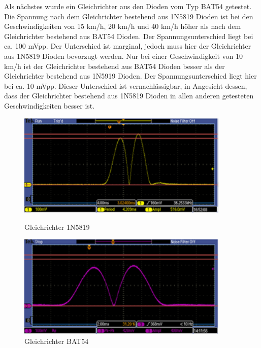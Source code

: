 Als nächstes wurde ein Gleichrichter aus den Dioden vom Typ BAT54 getestet. Die Spannung nach dem Gleichrichter bestehend aus 1N5819 Dioden ist bei den Geschwindigkeiten von 15 km/h, 20 km/h und 40 km/h höher als nach dem Gleichrichter bestehend aus BAT54 Dioden. Der Spannungsunterschied liegt bei ca. 100 mVpp. Der Unterschied ist marginal, jedoch muss hier der Gleichrichter aus 1N5819 Dioden bevorzugt werden. Nur bei einer Geschwindigkeit von 10 km/h ist der Gleichrichter bestehend aus BAT54 Dioden besser als der Gleichrichter bestehend aus 1N5919 Dioden. Der Spannungsunterschied liegt hier bei ca. 10 mVpp. Dieser Unterschied ist vernachlässigbar, in Angesicht dessen, dass der Gleichrichter bestehend aus 1N5819 Dioden in allen anderen getesteten Geschwindigkeiten besser ist.

\begin{figure}[ht]
 \begin{minipage}[t]{0.5\textwidth}
    \includegraphics[width=0.9\textwidth]{3Vorgehen/imag/Messung_Optimierung_Gleichrichter_2_links.png}
    \caption{Gleichrichter 1N5819}
    \label{messung_optimierung_gleichrichter_2} 
 \end{minipage}
 \begin{minipage}[t]{0.5\textwidth}
    \includegraphics[width=0.9\textwidth]{3Vorgehen/imag/Messung_Optimierung_Gleichrichter_2_rechts.png}
    \caption{Gleichrichter BAT54}
 \end{minipage}
\end{figure}

